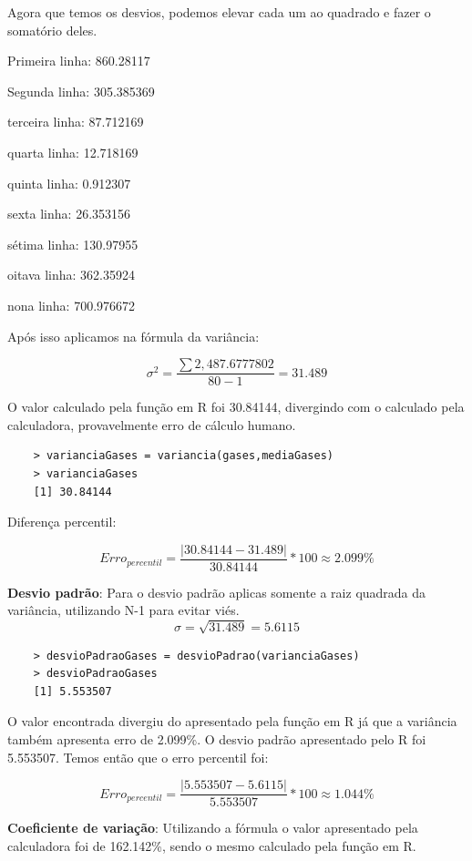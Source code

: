 \documentclass[a4paper,11pt]{article}
\begin{document}
\begin{description}
Agora que temos os desvios, podemos elevar cada um ao quadrado e fazer o somatório deles.

\item Primeira linha: 860.28117
\item Segunda linha: 305.385369
\item terceira linha: 87.712169
\item quarta linha: 12.718169
\item quinta linha: 0.912307
\item sexta linha: 26.353156
\item sétima linha: 130.97955
\item oitava linha: 362.35924
\item nona linha: 700.976672

Após isso aplicamos na fórmula da variância:

\[\sigma^2 = \frac{\sum 2,487.6777802}{80-1} = 31.489\]

O valor calculado pela função em R foi 30.84144, divergindo com o calculado pela calculadora, provavelmente erro de cálculo humano.

\begin{lstlisting}
    > varianciaGases = variancia(gases,mediaGases)
    > varianciaGases
    [1] 30.84144
\end{lstlisting}

Diferença percentil:

\[Erro_{percentil} = \frac{|30.84144 - 31.489|}{30.84144} * 100 \approx   2.099\% \]

\textbf{Desvio padrão}: Para o desvio padrão aplicas somente a raiz quadrada da variância, utilizando N-1 para evitar viés.
\[\sigma = \sqrt{31.489} = 5.6115\]

\begin{lstlisting}
    > desvioPadraoGases = desvioPadrao(varianciaGases)
    > desvioPadraoGases
    [1] 5.553507
\end{lstlisting}

O valor encontrada divergiu do apresentado pela função em R já que a variância também apresenta erro de 2.099\%. O desvio padrão apresentado pelo R foi 5.553507. Temos então que o erro percentil foi:

\[Erro_{percentil} = \frac{|5.553507 - 5.6115|}{5.553507} * 100 \approx   1.044\%\]

\textbf{Coeficiente de variação}: Utilizando a fórmula o valor apresentado pela calculadora foi de 162.142\%, sendo o mesmo calculado pela função em R.


\end{description}
\end{document}
